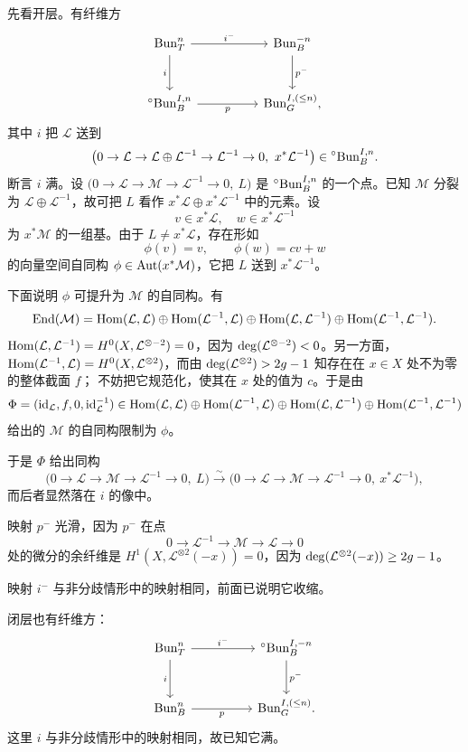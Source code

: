 先看开层。有纤维方
\[
\begin{tikzcd}[column sep=huge,row sep=large]
\Bun^n_T \arrow[r,"i^-"] \arrow[d,"i"'] & \Bun^{-n}_B \arrow[d,"p^-"]\\
\opn{\Bun}^{I,n}_B \arrow[r,"p"'] & \Bun^{I,(\le n)}_G,
\end{tikzcd}
\]
其中 $i$ 把 $\mathcal{L}$ 送到
\[
\bigl(0\to \mathcal{L}\to \mathcal{L}\oplus \mathcal{L}^{-1}\to \mathcal{L}^{-1}\to 0,\
x^*\mathcal{L}^{-1}\bigr)\in {}^{\circ}\mathrm{Bun}^{I,n}_B .
\]
断言 $i$ 满。设
$\bigl(0\to \mathcal{L}\to \mathcal{M}\to \mathcal{L}^{-1}\to 0,\ L\bigr)$ 是
${}^{\circ}\mathrm{Bun}^{I,n}_B$ 的一个点。已知 $\mathcal{M}$ 分裂为
$\mathcal{L}\oplus \mathcal{L}^{-1}$，故可把 $L$ 看作
$x^*\mathcal{L}\oplus x^*\mathcal{L}^{-1}$ 中的元素。设
\[
v\in x^*\mathcal{L},\quad w\in x^*\mathcal{L}^{-1}
\]
为 $x^*\mathcal{M}$ 的一组基。由于 $L\neq x^*\mathcal{L}$，存在形如
\[
\phi(v)=v,\qquad \phi(w)=cv+w
\]
的向量空间自同构 $\phi\in \operatorname{Aut}(x^*\mathcal{M})$，它把 $L$ 送到 $x^*\mathcal{L}^{-1}$。

下面说明 $\phi$ 可提升为 $\mathcal{M}$ 的自同构。有
\[
\operatorname{End}(\mathcal{M})=\operatorname{Hom}(\mathcal{L},\mathcal{L})\oplus \operatorname{Hom}(\mathcal{L}^{-1},\mathcal{L})
\oplus \operatorname{Hom}(\mathcal{L},\mathcal{L}^{-1})\oplus \operatorname{Hom}(\mathcal{L}^{-1},\mathcal{L}^{-1}).
\]
$\operatorname{Hom}(\mathcal{L},\mathcal{L}^{-1})=H^0(X,\mathcal{L}^{\otimes -2})=0$，因为
$\operatorname{deg}(\mathcal{L}^{\otimes -2})<0$。另一方面，
$\operatorname{Hom}(\mathcal{L}^{-1},\mathcal{L})=H^0(X,\mathcal{L}^{\otimes 2})$，而由
$\operatorname{deg}(\mathcal{L}^{\otimes 2})>2g-1$ 知存在在 $x\in X$ 处不为零的整体截面 $f$；
不妨把它规范化，使其在 $x$ 处的值为 $c$。于是由
\[
\Phi=(\mathrm{id}_{\mathcal{L}},f,0,\mathrm{id}_{\mathcal{L}}^{-1})
\in \operatorname{Hom}(\mathcal{L},\mathcal{L})\oplus \operatorname{Hom}(\mathcal{L}^{-1},\mathcal{L})
\oplus \operatorname{Hom}(\mathcal{L},\mathcal{L}^{-1})\oplus \operatorname{Hom}(\mathcal{L}^{-1},\mathcal{L}^{-1})
\]
给出的 $\mathcal{M}$ 的自同构限制为 $\phi$。

于是 $\Phi$ 给出同构
\[
\bigl(0\to \mathcal{L}\to \mathcal{M}\to \mathcal{L}^{-1}\to 0,\ L\bigr)
\xrightarrow{\ \sim\ }
\bigl(0\to \mathcal{L}\to \mathcal{M}\to \mathcal{L}^{-1}\to 0,\ x^*\mathcal{L}^{-1}\bigr),
\]
而后者显然落在 $i$ 的像中。

映射 $p^-$ 光滑，因为 $p^-$ 在点
\[
0\to \mathcal{L}^{-1}\to \mathcal{M}\to \mathcal{L}\to 0
\]
处的微分的余纤维是 $H^1(X,\mathcal{L}^{\otimes 2}(-x))=0$，因为
$\operatorname{deg}(\mathcal{L}^{\otimes 2}(-x))\ge 2g-1$。

映射 $i^-$ 与非分歧情形中的映射相同，前面已说明它收缩。

闭层也有纤维方：
\[
\begin{tikzcd}[column sep=huge,row sep=large]
\Bun^n_T \arrow[r,"i^-"] \arrow[d,"i"'] & \opn{\Bun}^{I,-n}_B \arrow[d,"p^-"]\\
\Bun^n_B \arrow[r,"p"'] & \Bun^{I,(\le n)}_G .
\end{tikzcd}
\]
这里 $i$ 与非分歧情形中的映射相同，故已知它满。

